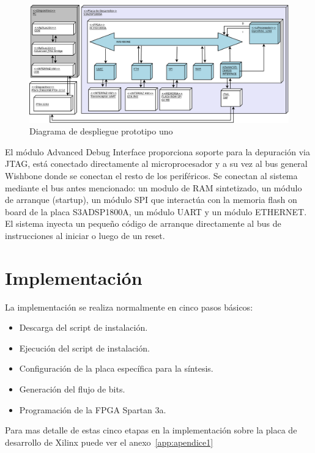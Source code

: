 		\begin{figure}[!h]
 		\begin{center}
  		\includegraphics[width=1.3\textwidth,keepaspectratio=true,angle=90]{./images/proto1}
  		\caption{Diagrama de despliegue prototipo uno}
  		\label{fig:minsoc}
 		\end{center}
		\end{figure}
		
		El módulo Advanced Debug Interface proporciona soporte para la depuración via JTAG, está conectado directamente al microprocesador y a su vez al bus
		general Wishbone donde se conectan el resto de los periféricos. Se conectan al sistema mediante el bus antes mencionado: un modulo de RAM
		sintetizado, un módulo de arranque (startup), un módulo SPI que interactúa con la memoria flash on board de la placa S3ADSP1800A, un módulo UART y
		un módulo ETHERNET. El sistema inyecta un pequeño código de arranque directamente al bus de instrucciones al iniciar o luego de un reset. 


			
		\section{Implementación}

La implementación se realiza normalmente en cinco pasos básicos: 
\begin {itemize}
\item Descarga del script de instalación.
\item Ejecución del script de instalación.
\item Configuración de la placa específica para la síntesis.
\item Generación del flujo de bits.
\item Programación de la FPGA Spartan 3a.
 \end {itemize}
Para mas detalle de estas cinco etapas en la implementación sobre la placa de desarrollo  de Xilinx puede ver el anexo~\ref{app:apendice1}

